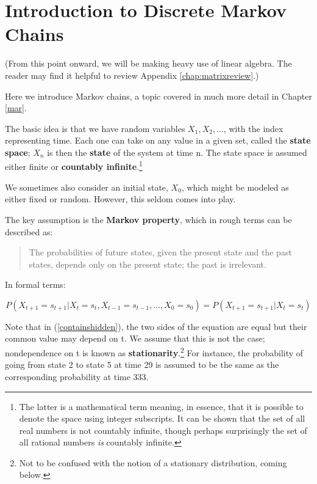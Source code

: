\chapter{Introduction to Discrete Markov Chains}  
\label{dismarkov}

(From this point onward, we will be making heavy use of linear algebra.
The reader may find it helpful to review Appendix
\ref{chap:matrixreview}.)

Here we introduce Markov chains, a topic covered in much more detail in
Chapter \ref{mar}.  

The basic idea is that we have random variables $X_1, X_2, ...$, with
the index representing time.  Each one can take on any value in a given
set, called the {\bf state space}; $X_n$ is then the {\bf state} of the
system at time n.  The state space is assumed either finite or {\bf countably
infinite}.\footnote{The latter is a mathematical term meaning, in
essence, that it is possible to denote the space using integer
subscripts.  It can be shown that the set of all real numbers is not 
countably infinite, though perhaps surprisingly the set of all rational
numbers {\it is} countably infinite.} 

We sometimes also consider an initial state, $X_0$, which might be
modeled as either fixed or random.  However, this seldom comes into
play.

The key assumption is the {\bf Markov property}, which in rough terms
can be described as:

\begin{quote}
The probabilities of future states, given the present state and the past
states, depends only on the present state; the past is irrelevant.
\end{quote}

In formal terms:

\begin{equation}
\label{containshidden}
P(X_{t+1}=s_{t+1}|X_{t}=s_{t},X_{t-1}=s_{t-1},\ldots ,X_{0}=s_{0})=P(X_{t+1}=s_{t+1}|X_{t}=s_{t})
\end{equation}

Note that in (\ref{containshidden}), the two sides of the equation are
equal but their common value may depend on t.  We assume that this is
not the case; nondependence on t is known as {\bf
stationarity}.\footnote{Not to be confused with the notion of a
stationary distribution, coming below.} For instance, the probability of
going from state 2 to state 5 at time 29 is assumed to be the same as
the corresponding probability at time 333.

